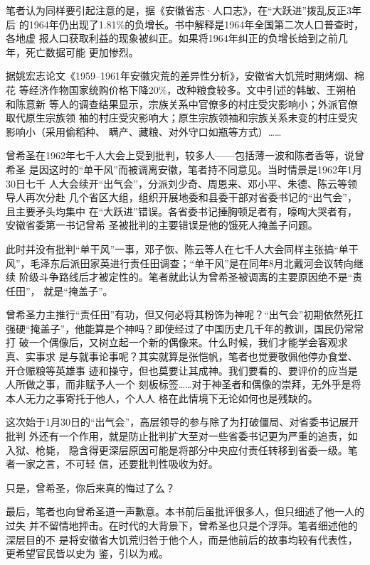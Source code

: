 笔者认为同样要引起注意的是，据《安徽省志·人口志》，在“大跃进”拨乱反正3年后
的1964年仍出现了1.81\%的负增长。书中解释是1964年全国第二次人口普查时，各地虚
报人口获取利益的现象被纠正。如果将1964年纠正的负增长给到之前几年，死亡数据可能
更加惨烈。

据姚宏志论文《1959--1961年安徽灾荒的差异性分析》，安徽省大饥荒时期烤烟、棉花
等经济作物国家统购价格下降20\%，改种粮食较多。文中引述的韩敏、王朔柏和陈意新
等人的调查结果显示，宗族关系中官僚多的村庄受灾影响小；外派官僚取代原生宗族领
袖的村庄受灾影响大；原生宗族领袖和宗族关系未变的村庄受灾影响小（采用偷稻种、
瞒产、藏粮、对外守口如瓶等方式）……

曾希圣在1962年七千人大会上受到批判，较多人——包括薄一波和陈者香等，说曾希圣
是因这时的“单干风”而被调离安徽，笔者持不同意见。当时情景是1962年1月30日七千
人大会续开“出气会”，分派刘少奇、周恩来、邓小平、朱德、陈云等领导人再次分赴
几个省区大组，组织开展地委和县委干部对省委书记的“出气会”，且主要矛头均集中
在“大跃进”错误。各省委书记捶胸顿足者有，嚎啕大哭者有，安徽省委第一书记曾希
圣被批判的主要错误是他的饿死人掩盖子问题。

此时并没有批判“单干风”一事，邓子恢、陈云等人在七千人大会同样主张搞“单干
风”，毛泽东后派田家英进行责任田调查；“单干风”是在同年8月北戴河会议转向继续
阶级斗争路线后才被定性的。笔者就此认为曾希圣被调离的主要原因绝不是“责任田”，
就是“掩盖子”。

曾希圣力主推行“责任田”有功，但又何必将其粉饰为神呢？“出气会”初期依然死扛
强硬“掩盖子”，他能算是个神吗？即使经过了中国历史几千年的教训，国民仍常常打
破一个偶像后，又树立起一个新的偶像来。什么时候，我们才能学会客观求真、实事求
是与就事论事呢？其实就算是张恺帆，笔者也觉要敬佩他停办食堂、开仓赈粮等英雄事
迹和操守，但也莫要让其成神。我们要看的、要评价的应当是人所做之事，而非赋予人一个
刻板标签……对于神圣者和偶像的崇拜，无外乎是将本人无力之事寄托于他人，个人人
格在此情境下无论如何也是残缺的。

这次始于1月30日的“出气会”，高层领导的参与除了为打破僵局、对省委书记展开批判
外还有一个作用，就是防止批判扩大至对一些省委书记更为严重的追责，如入狱、枪毙，
隐含得更深层原因可能是将部分中央应付责任转移到省委一级。笔者一家之言，不可轻
信，还要批判性吸收为好。

只是，曾希圣，你后来真的悔过了么？

最后，笔者也向曾希圣道一声歉意。本书前后虽批评很多人，但只细述了他一人的过失
并不留情地抨击。在时代的大背景下，曾希圣也只是个浮萍。笔者细述他的深层目的不
是将安徽省大饥荒归咎于他个人，而是他前后的故事均较有代表性，更希望官民皆以史为
鉴，引以为戒。

